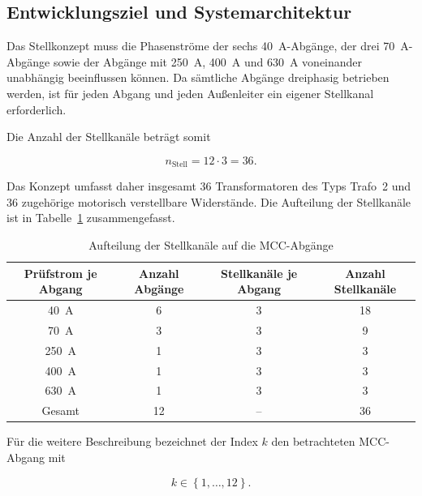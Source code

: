 \subsection{Entwicklungsziel und Systemarchitektur}
\label{sec:entwicklungsziel_systemarchitektur}

Das Stellkonzept muss die Phasenströme der sechs
\SI{40}{\ampere}-Abgänge, der drei \SI{70}{\ampere}-Abgänge sowie der
Abgänge mit \SI{250}{\ampere}, \SI{400}{\ampere} und
\SI{630}{\ampere} voneinander unabhängig beeinflussen können. Da
sämtliche Abgänge dreiphasig betrieben werden, ist für jeden Abgang
und jeden Außenleiter ein eigener Stellkanal erforderlich.

Die Anzahl der Stellkanäle beträgt somit

\begin{equation}
    n_{\mathrm{Stell}}
    =
    12 \cdot 3
    =
    36.
    \label{eq:anzahl_stellkanaele}
\end{equation}

Das Konzept umfasst daher insgesamt 36 Transformatoren des Typs
Trafo~2 und 36 zugehörige motorisch verstellbare Widerstände. Die
Aufteilung der Stellkanäle ist in
Tabelle~\ref{tab:aufteilung_stellkanaele} zusammengefasst.

\begin{table}[H]
    \centering
    \caption{Aufteilung der Stellkanäle auf die MCC-Abgänge}
    \label{tab:aufteilung_stellkanaele}
    \begin{tabular}{cccc}
        \toprule
        Prüfstrom je Abgang &
        Anzahl Abgänge &
        Stellkanäle je Abgang &
        Anzahl Stellkanäle \\
        \midrule
        \SI{40}{\ampere}  & 6 & 3 & 18 \\
        \SI{70}{\ampere}  & 3 & 3 & 9  \\
        \SI{250}{\ampere} & 1 & 3 & 3  \\
        \SI{400}{\ampere} & 1 & 3 & 3  \\
        \SI{630}{\ampere} & 1 & 3 & 3  \\
        \midrule
        Gesamt            & 12 & -- & 36 \\
        \bottomrule
    \end{tabular}
\end{table}

Für die weitere Beschreibung bezeichnet der Index \(k\) den
betrachteten MCC-Abgang mit

\begin{equation}
    k \in \left\{1,\ldots,12\right\}.
    \label{eq:definition_abgangsindex}
\end{equation}

